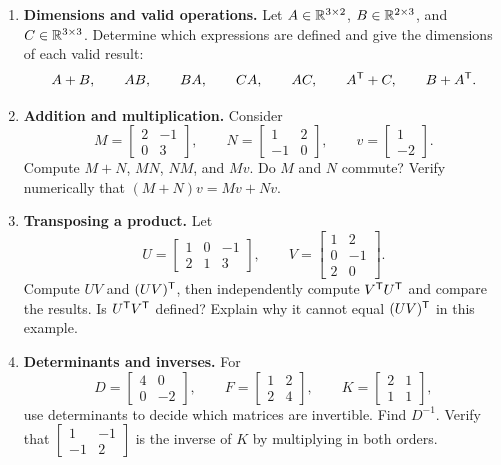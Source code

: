 \begin{enumerate}
\item \textbf{Dimensions and valid operations.}
Let $A\in\mathbb{R}^{3\times2}$, $B\in\mathbb{R}^{2\times3}$, and
$C\in\mathbb{R}^{3\times3}$. Determine which expressions are defined and give the
dimensions of each valid result:
\[
 A+B,\qquad AB,\qquad BA,\qquad CA,\qquad AC,\qquad
 A^{\mathsf T}+C,\qquad B+A^{\mathsf T}.
\]

\item \textbf{Addition and multiplication.}
Consider
\[
 M=\begin{bmatrix}2&-1\\0&3\end{bmatrix},\qquad
 N=\begin{bmatrix}1&2\\-1&0\end{bmatrix},\qquad
 v=\begin{bmatrix}1\\-2\end{bmatrix}.
\]
Compute $M+N$, $MN$, $NM$, and $Mv$. Do $M$ and $N$ commute?
Verify numerically that $(M+N)v=Mv+Nv$.

\item \textbf{Transposing a product.}
Let
\[
 U=\begin{bmatrix}1&0&-1\\2&1&3\end{bmatrix},\qquad
 V=\begin{bmatrix}1&2\\0&-1\\2&0\end{bmatrix}.
\]
Compute $UV$ and $(UV)^{\mathsf T}$, then independently compute
$V^{\mathsf T} U^{\mathsf T}$ and compare the results. Is $U^{\mathsf T} V^{\mathsf T}$
defined? Explain why it cannot equal $(UV)^{\mathsf T}$ in this example.

\item \textbf{Determinants and inverses.}
For
\[
 D=\begin{bmatrix}4&0\\0&-2\end{bmatrix},\qquad
 F=\begin{bmatrix}1&2\\2&4\end{bmatrix},\qquad
 K=\begin{bmatrix}2&1\\1&1\end{bmatrix},
\]
use determinants to decide which matrices are invertible. Find $D^{-1}$.
Verify that $\begin{bmatrix}1&-1\\-1&2\end{bmatrix}$ is the inverse of
$K$ by multiplying in both orders.


\end{enumerate}
